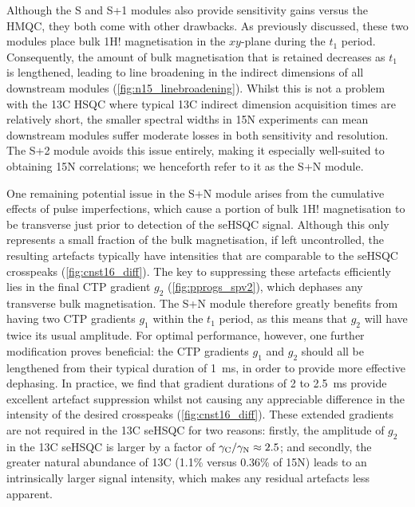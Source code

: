 \documentclass[11pt]{article}
\newcommand*{\noahS}{S}
\newcommand*{\noahSpa}{S+1}
\newcommand*{\noahSpb}{S+2}
\newcommand*{\noahSpn}{S+N}
\newcommand*{\carbon}{13C}
\newcommand*{\nitrogen}{15N}
\newcommand*{\magnnot}[1]{1H!#1}
\begin{document}
\begin{refsection}
Although the \noahS{} and \noahSpa{} modules also provide sensitivity gains versus the HMQC, they both come with other drawbacks.
As previously discussed, these two modules place bulk \magnnot{} magnetisation in the $xy$-plane during the $t_1$ period.
Consequently, the amount of bulk magnetisation that is retained decreases as $t_1$ is lengthened, leading to line broadening in the indirect dimensions of all downstream modules (\cref{fig:n15_linebroadening}).
Whilst this is not a problem with the \carbon{} HSQC where typical \carbon{} indirect dimension acquisition times are relatively short, the smaller spectral widths in \nitrogen{} experiments can mean downstream modules suffer moderate losses in both sensitivity and resolution.
The \noahSpb{} module avoids this issue entirely, making it especially well-suited to obtaining \nitrogen{} correlations; we henceforth refer to it as the \noahSpn{} module.

One remaining potential issue in the \noahSpn{} module arises from the cumulative effects of pulse imperfections, which cause a portion of bulk \magnnot{} magnetisation to be transverse just prior to detection of the seHSQC signal.
Although this only represents a small fraction of the bulk magnetisation, if left uncontrolled, the resulting artefacts typically have intensities that are comparable to the seHSQC crosspeaks (\cref{fig:cnst16_diff}).
The key to suppressing these artefacts efficiently lies in the final CTP gradient $g_2$ (\cref{fig:pprogs_spv2}), which dephases any transverse bulk magnetisation.
The \noahSpn{} module therefore greatly benefits from having two CTP gradients $g_1$ within the $t_1$ period, as this means that $g_2$ will have twice its usual amplitude.
For optimal performance, however, one further modification proves beneficial: the CTP gradients $g_1$ and $g_2$ should all be lengthened from their typical duration of \SI{1}{\ms}, in order to provide more effective dephasing.
In practice, we find that gradient durations of 2 to \SI{2.5}{\ms} provide excellent artefact suppression whilst not causing any appreciable difference in the intensity of the desired crosspeaks (\cref{fig:cnst16_diff}).
These extended gradients are not required in the \carbon{} seHSQC for two reasons: firstly, the amplitude of $g_2$ in the \carbon{} seHSQC is larger by a factor of $\gamma_{\ce{C}}/\gamma_{\ce{N}} \approx 2.5$; and secondly, the greater natural abundance of \carbon{} (1.1\% versus 0.36\% of \nitrogen{}) leads to an intrinsically larger signal intensity, which makes any residual artefacts less apparent.


\end{refsection}
\end{document}
